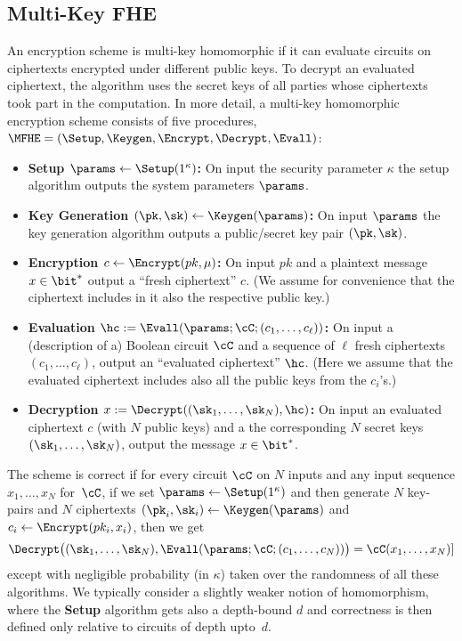 \subsection{Multi-Key FHE}\label{sec:mkeyFHE}
An encryption scheme is multi-key homomorphic if it can evaluate
circuits on ciphertexts encrypted under different public keys. To
decrypt an evaluated ciphertext, the algorithm uses the secret keys of
all parties whose ciphertexts took part in the computation. 
In more detail, a multi-key homomorphic encryption scheme
consists of five procedures,
$\MFHE = (\Setup, \Keygen,\Encrypt,\Decrypt,\Evall)$:
\begin{itemize}
\item {\bf Setup $\params \leftarrow \Setup(1^\kappa)$:}
  On input the security parameter $\kappa$ %
  the setup algorithm outputs the system parameters $\params$. 
\item {\bf Key Generation $(\pk, \sk) \leftarrow \Keygen(\params)$:}
  On input $\params$ the key generation algorithm outputs a
  public/secret key pair $(\pk,\sk)$.
\item {\bf Encryption $ c \leftarrow \Encrypt(pk,\mu)$:}
  On input $pk$ and a plaintext message $x\in \bit^*$ output a
  ``fresh ciphertext'' $c$.
  (We assume for convenience that the ciphertext includes in
  it also the respective public key.)
\item {\bf Evaluation $\hc:= \Evall(\params; \cC; (c_1,\ldots, c_\ell))$:}
  On input a (description of a) Boolean circuit $\cC$ %
  and a sequence of $\ell$ fresh ciphertexts $(c_1,\ldots,c_\ell)$,
  output an ``evaluated ciphertext'' $\hc$.
  (Here we assume that the evaluated ciphertext includes also all
  the public keys from the $c_i$'s.)
\item {\bf Decryption $x := \Decrypt((\sk_1,\ldots, \sk_N), \hc)$:}
  On input an evaluated ciphertext $c$ (with $N$ public keys) and a
  the corresponding $N$ secret keys $(\sk_1,\ldots,\sk_N)$, output
  the message $x\in \bit^*$.
\end{itemize}

The scheme is correct if for every circuit $\cC$ on $N$ inputs and any input sequence $x_1,\ldots,x_N$ for~$\cC$, if we set $\params \leftarrow \Setup(1^\kappa)$ and then generate $N$ key-pairs and $N$ ciphertexts $(\pk_i,\sk_i) \leftarrow \Keygen(\params)$ and $c_i \leftarrow \Encrypt(pk_i,x_i)$, then we get
\[
\Decrypt\big((\sk_1,\ldots, \sk_N), \Evall(\params; \cC; (c_1,\ldots,c_N))
\big)
= \cC(x_1,\ldots, x_N)]
\]
except with negligible probability (in $\kappa$) taken over the randomness of all these algorithms.
We typically consider a slightly weaker notion of homomorphism, where the \textbf{Setup} algorithm gets also a depth-bound $d$ and correctness is then defined only relative to circuits of depth upto~$d$.

